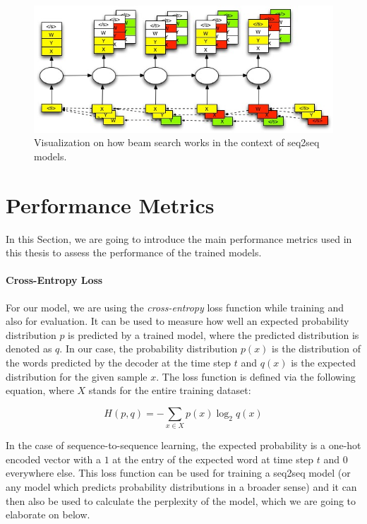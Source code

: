 \begin{figure}[H]
	\label{fundamentals:seq2seq:beam_search}
	\centering
	\includegraphics[width=12cm]{img/beam_search_visualization}
	\caption{Visualization on how beam search works in the context of seq2seq models.\protect\footnotemark}
\end{figure}

\section{Performance Metrics}
\label{fundamentals:metrics}
In this Section, we are going to introduce the main performance metrics used in this thesis to assess the performance of the trained models.

\paragraph{Cross-Entropy Loss} For our model, we are using the \emph{cross-entropy} loss function while training and also for evaluation. It can be used to measure how well an expected probability distribution $p$ is predicted by a trained model, where the predicted distribution is denoted as $q$. In our case, the probability distribution $p(x)$ is the distribution of the words predicted by the decoder at the time step $t$ and $q(x)$ is the expected distribution for the given sample $x$. The loss function is defined via the following equation, where $X$ stands for the entire training dataset:

\begin{equation}
H(p, q) = -\sum_{x \in X} p(x) \log_2 q(x)
\end{equation}

In the case of sequence-to-sequence learning, the expected probability is a one-hot encoded vector with a $1$ at the entry of the expected word at time step $t$ and $0$ everywhere else. This loss function can be used for training a seq2seq model (or any model which predicts probability distributions in a broader sense) and it can then also be used to calculate the perplexity of the model, which we are going to elaborate on below.

